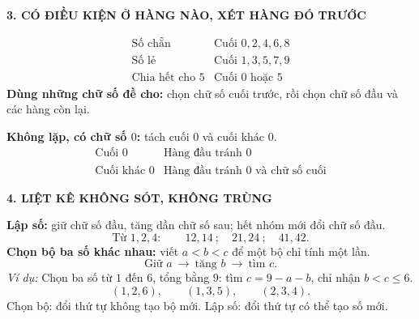 \documentclass[12pt, a4paper]{article}
\begin{document}

\newpage

\begin{theorybox}
\textbf{3. CÓ ĐIỀU KIỆN Ở HÀNG NÀO, XÉT HÀNG ĐÓ TRƯỚC}

\[
\begin{array}{c|c}
\text{Số chẵn}&\text{Cuối }0,2,4,6,8\\
\text{Số lẻ}&\text{Cuối }1,3,5,7,9\\
\text{Chia hết cho }5&\text{Cuối }0\text{ hoặc }5
\end{array}
\]
\noindent\textbf{Dùng những chữ số đề cho:} chọn chữ số cuối trước, rồi chọn chữ số đầu và các hàng còn lại.\par
\smallskip
\noindent\textbf{Không lặp, có chữ số $0$:} tách cuối $0$ và cuối khác $0$.
\[
\begin{array}{c|l}
\text{Cuối }0&\text{Hàng đầu tránh }0\\
\text{Cuối khác }0&\text{Hàng đầu tránh }0\text{ và chữ số cuối}
\end{array}
\]
\end{theorybox}



\newpage

\begin{theorybox}
\textbf{4. LIỆT KÊ KHÔNG SÓT, KHÔNG TRÙNG}

\noindent\textbf{Lập số:} giữ chữ số đầu, tăng dần chữ số sau; hết nhóm mới đổi chữ số đầu.
\[
\text{Từ }1,2,4:\qquad12,14\ ;\quad21,24\ ;\quad41,42.
\]
\noindent\textbf{Chọn bộ ba số khác nhau:} viết $a<b<c$ để một bộ chỉ tính một lần.
\[
\text{Giữ }a\ \longrightarrow\ \text{tăng }b\ \longrightarrow\ \text{tìm }c.
\]
\noindent\textit{Ví dụ:} Chọn ba số từ $1$ đến $6$, tổng bằng $9$: tìm $c=9-a-b$, chỉ nhận $b<c\le6$.
\[
(1,2,6),\qquad(1,3,5),\qquad(2,3,4).
\]
\centering Chọn bộ: đổi thứ tự không tạo bộ mới. Lập số: đổi thứ tự có thể tạo số mới.
\end{theorybox}
\end{document}
